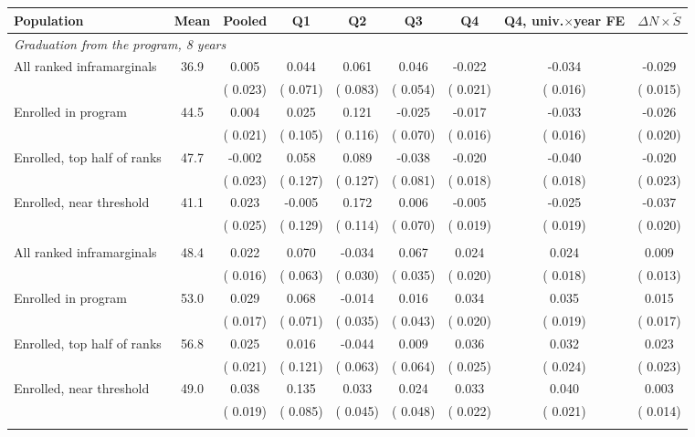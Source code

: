 \begin{tabular}{lcccccccc}
\toprule
Population & Mean & Pooled & Q1 & Q2 & Q3 & Q4 & Q4, univ.\(\times\)year FE & \(\Delta N\times\tilde S\) \\
\midrule
\multicolumn{9}{l}{\textit{Graduation from the program, 8 years}} \\
All ranked inframarginals &  36.9 &   0.005 &   0.044 &   0.061 &   0.046 &  -0.022 &  -0.034\sym{**} &  -0.029\sym{*} \\
 &  & ( 0.023) & ( 0.071) & ( 0.083) & ( 0.054) & ( 0.021) & ( 0.016) & ( 0.015) \\
Enrolled in program &  44.5 &   0.004 &   0.025 &   0.121 &  -0.025 &  -0.017 &  -0.033\sym{**} &  -0.026 \\
 &  & ( 0.021) & ( 0.105) & ( 0.116) & ( 0.070) & ( 0.016) & ( 0.016) & ( 0.020) \\
\quad Enrolled, top half of ranks &  47.7 &  -0.002 &   0.058 &   0.089 &  -0.038 &  -0.020 &  -0.040\sym{**} &  -0.020 \\
 &  & ( 0.023) & ( 0.127) & ( 0.127) & ( 0.081) & ( 0.018) & ( 0.018) & ( 0.023) \\
\quad Enrolled, near threshold &  41.1 &   0.023 &  -0.005 &   0.172 &   0.006 &  -0.005 &  -0.025 &  -0.037\sym{*} \\
 &  & ( 0.025) & ( 0.129) & ( 0.114) & ( 0.070) & ( 0.019) & ( 0.019) & ( 0.020) \\
\addlinespace
\multicolumn{9}{l}{\textit{Graduation from any university, 8 years}} \\
All ranked inframarginals &  48.4 &   0.022 &   0.070 &  -0.034 &   0.067\sym{*} &   0.024 &   0.024 &   0.009 \\
 &  & ( 0.016) & ( 0.063) & ( 0.030) & ( 0.035) & ( 0.020) & ( 0.018) & ( 0.013) \\
Enrolled in program &  53.0 &   0.029\sym{*} &   0.068 &  -0.014 &   0.016 &   0.034\sym{*} &   0.035\sym{*} &   0.015 \\
 &  & ( 0.017) & ( 0.071) & ( 0.035) & ( 0.043) & ( 0.020) & ( 0.019) & ( 0.017) \\
\quad Enrolled, top half of ranks &  56.8 &   0.025 &   0.016 &  -0.044 &   0.009 &   0.036 &   0.032 &   0.023 \\
 &  & ( 0.021) & ( 0.121) & ( 0.063) & ( 0.064) & ( 0.025) & ( 0.024) & ( 0.023) \\
\quad Enrolled, near threshold &  49.0 &   0.038\sym{**} &   0.135 &   0.033 &   0.024 &   0.033 &   0.040\sym{*} &   0.003 \\
 &  & ( 0.019) & ( 0.085) & ( 0.045) & ( 0.048) & ( 0.022) & ( 0.021) & ( 0.014) \\
\addlinespace
\bottomrule
\end{tabular}
